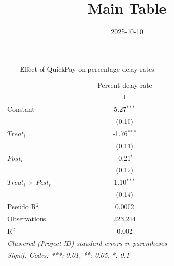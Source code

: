 \documentclass[
]{article}
\title{Main Table}
\author{}
\date{\vspace{-2.5em}2025-10-10}
\begin{document}
\maketitle

\begin{table}[htbp]
   \caption{Effect of QuickPay on percentage delay rates}
   \centering
   \small
   \begin{tabular}{lc}
      \toprule
                                   & Percent delay rate\\  
                                   & I\\  
      \midrule 
      Constant                     & 5.27$^{***}$\\   
                                   & (0.10)\\   
      $Treat_i$                    & -1.76$^{***}$\\   
                                   & (0.11)\\   
      $Post_t$                     & -0.21$^{*}$\\   
                                   & (0.12)\\   
      $Treat_i$ $\times$ $Post_t$  & 1.10$^{***}$\\   
                                   & (0.14)\\   
      Pseudo R$^2$                 & 0.0002\\  
      Observations                 & 223,244\\  
      R$^2$                        & 0.002\\  
      \midrule
      \multicolumn{2}{l}{\emph{Clustered (Project ID) standard-errors in parentheses}}\\
      \multicolumn{2}{l}{\emph{Signif. Codes: ***: 0.01, **: 0.05, *: 0.1}}\\
   \end{tabular}
\end{table}
\end{document}
